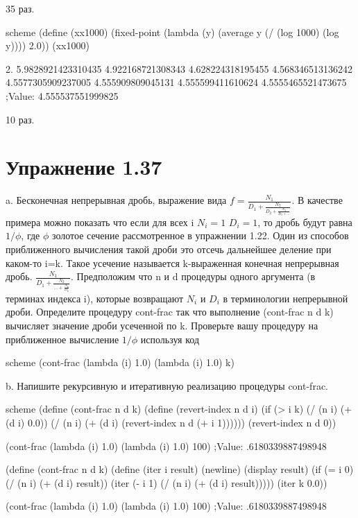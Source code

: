 35 раз.

\begin{codelisting}{scheme}
(define (xx1000)
  (fixed-point (lambda (y) (average y (/ (log 1000) (log y))))
               2.0))
(xx1000)
\end{codelisting}

2.
5.9828921423310435
4.922168721308343
4.628224318195455
4.568346513136242
4.5577305909237005
4.555909809045131
4.555599411610624
4.5555465521473675
;Value: 4.555537551999825

10 раз.

\chapter{Упражнение 1.37}

a. Бесконечная непрерывная дробь, выражение вида $f=\frac{N_1}{D_1+\frac{N_2}{D_2+\frac{N_3}{D_3+...}}}$. В качестве примера можно показать что если для всех i $N_i=1$ $D_i=1$, то дробь будут равна $1/\phi$, где $\phi$ золотое сечение рассмотренное в упражнении 1.22. Один из способов приближенного вычисления такой дроби это отсечь дальнейшее деление при каком-то i=k. Такое усечение называется k-выраженная конечная непрерывная дробь. $\frac{N_1}{D_1+\frac{N_2}{...+\frac{N_k}{D_k}}}$.
Предположим что n и d процедуры одного аргумента (в терминах индекса i), которые возвращают $N_i$ и $D_i$ в терминологии непрерывной дроби. Определите процедуру cont-frac так что выполнение (cont-frac n d k) вычисляет значение дроби усеченной по k. Проверьте вашу процедуру на приближенное вычисление $1/\phi$ используя код

\begin{codelisting}{scheme}
(cont-frac (lambda (i) 1.0)
           (lambda (i) 1.0)
           k)
\end{codelisting}

b. Напишите рекурсивную и итеративную реализацию процедуры cont-frac.

\begin{codelisting}{scheme}
(define (cont-frac n d k)
  (define (revert-index n d i)
    (if (> i k)
        (/ (n i) (+ (d i) 0.0))
        (/ (n i) (+ (d i) (revert-index n d (+ i 1))))))
  (revert-index n d 0))

(cont-frac (lambda (i) 1.0)
           (lambda (i) 1.0)
           100) ;Value: .6180339887498948


(define (cont-frac n d k)
  (define (iter i result)
    (newline)
    (display result)
    (if (= i 0)
        (/ (n i) (+ (d i) result))
        (iter (- i 1) (/ (n i) (+ (d i) result)))))
  (iter k 0.0))

(cont-frac (lambda (i) 1.0)
           (lambda (i) 1.0)
           100) ;Value: .6180339887498948
\end{codelisting}

